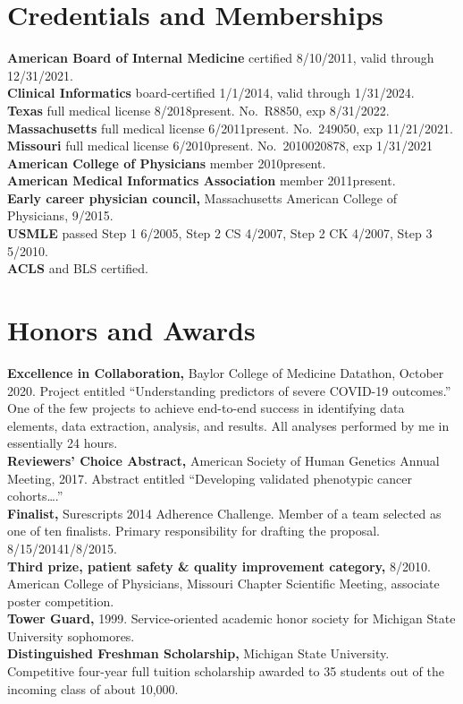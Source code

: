 \documentclass[10pt]{article}
\begin{document}
\section*{Credentials and Memberships}
\textbf{American Board of Internal Medicine} certified 8/10/2011,
valid through 12/31/2021.\\
\textbf{Clinical Informatics} board-certified 1/1/2014, valid through
1/31/2024.\\
\textbf{Texas} full medical license 8/2018\ndash{}present. No.\ R8850,
exp 8/31/2022.\\
\textbf{Massachusetts} full medical license 6/2011\ndash{}present.
No.\ 249050, exp 11/21/2021.\\
\textbf{Missouri} full medical license 6/2010\ndash{}present. No.\ 2010020878, exp 1/31/2021\\
\textbf{American College of Physicians} member 2010\ndash{}present.\\
\textbf{American Medical Informatics Association} member
2011\ndash{}present.\\
\textbf{Early career physician council,} Massachusetts American
College of Physicians, 9/\ndash{}2015.\\
\textbf{USMLE} passed Step 1 6/2005, Step 2 CS 4/2007, Step 2 CK
4/2007, Step 3 5/2010.\\
\textbf{ACLS} and BLS certified.


\section*{Honors and Awards}

\textbf{Excellence in Collaboration,} Baylor College of Medicine
Datathon, October 2020. Project entitled ``Understanding predictors of
severe COVID-19 outcomes.'' One of the few projects to achieve
end-to-end success in identifying data elements, data extraction,
analysis, and results. All analyses performed by me in essentially 24
hours.\\
\textbf{Reviewers' Choice Abstract,} American Society of Human
Genetics Annual Meeting, 2017. Abstract entitled ``Developing
validated phenotypic cancer cohorts\ldots{}.''\\
\textbf{Finalist,} Surescripts 2014 Adherence Challenge. Member of a
team selected as one of ten finalists. Primary responsibility for
drafting the proposal. 8/15/2014\ndash{}1/8/2015.\\
\textbf{Third prize, patient safety \& quality improvement category,}
8/2010. American College of Physicians, Missouri Chapter Scientific
Meeting, associate poster competition.\\
\textbf{Tower Guard,} 1999. Service-oriented academic honor
society for Michigan State University sophomores.\\
\textbf{Distinguished Freshman Scholarship,} Michigan State
University. Competitive four-year full tuition scholarship awarded to
35 students out of the incoming class of about 10,000.
\end{document}
